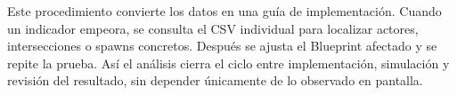 Este procedimiento convierte los datos en una guía de implementación. Cuando un indicador empeora, se consulta el CSV individual para localizar actores, intersecciones o spawns concretos. Después se ajusta el Blueprint afectado y se repite la prueba. Así el análisis cierra el ciclo entre implementación, simulación y revisión del resultado, sin depender únicamente de lo observado en pantalla.
